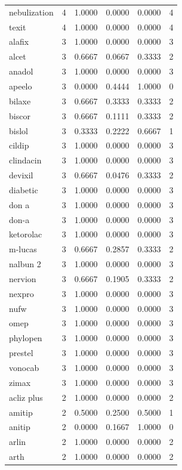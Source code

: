\begin{longtable}{p{3.0cm}rrrrr}
nebulization & 4 & 1.0000 & 0.0000 & 0.0000 & 4 \\
texit & 4 & 1.0000 & 0.0000 & 0.0000 & 4 \\
alafix & 3 & 1.0000 & 0.0000 & 0.0000 & 3 \\
alcet & 3 & 0.6667 & 0.0667 & 0.3333 & 2 \\
anadol & 3 & 1.0000 & 0.0000 & 0.0000 & 3 \\
apeelo & 3 & 0.0000 & 0.4444 & 1.0000 & 0 \\
bilaxe & 3 & 0.6667 & 0.3333 & 0.3333 & 2 \\
biscor & 3 & 0.6667 & 0.1111 & 0.3333 & 2 \\
bislol & 3 & 0.3333 & 0.2222 & 0.6667 & 1 \\
cildip & 3 & 1.0000 & 0.0000 & 0.0000 & 3 \\
clindacin & 3 & 1.0000 & 0.0000 & 0.0000 & 3 \\
devixil & 3 & 0.6667 & 0.0476 & 0.3333 & 2 \\
diabetic & 3 & 1.0000 & 0.0000 & 0.0000 & 3 \\
don a & 3 & 1.0000 & 0.0000 & 0.0000 & 3 \\
don-a & 3 & 1.0000 & 0.0000 & 0.0000 & 3 \\
ketorolac & 3 & 1.0000 & 0.0000 & 0.0000 & 3 \\
m-lucas & 3 & 0.6667 & 0.2857 & 0.3333 & 2 \\
nalbun 2 & 3 & 1.0000 & 0.0000 & 0.0000 & 3 \\
nervion & 3 & 0.6667 & 0.1905 & 0.3333 & 2 \\
nexpro & 3 & 1.0000 & 0.0000 & 0.0000 & 3 \\
nufw & 3 & 1.0000 & 0.0000 & 0.0000 & 3 \\
omep & 3 & 1.0000 & 0.0000 & 0.0000 & 3 \\
phylopen & 3 & 1.0000 & 0.0000 & 0.0000 & 3 \\
prestel & 3 & 1.0000 & 0.0000 & 0.0000 & 3 \\
vonocab & 3 & 1.0000 & 0.0000 & 0.0000 & 3 \\
zimax & 3 & 1.0000 & 0.0000 & 0.0000 & 3 \\
acliz plus & 2 & 1.0000 & 0.0000 & 0.0000 & 2 \\
amitip & 2 & 0.5000 & 0.2500 & 0.5000 & 1 \\
anitip & 2 & 0.0000 & 0.1667 & 1.0000 & 0 \\
arlin & 2 & 1.0000 & 0.0000 & 0.0000 & 2 \\
arth & 2 & 1.0000 & 0.0000 & 0.0000 & 2 \\

\end{longtable}
